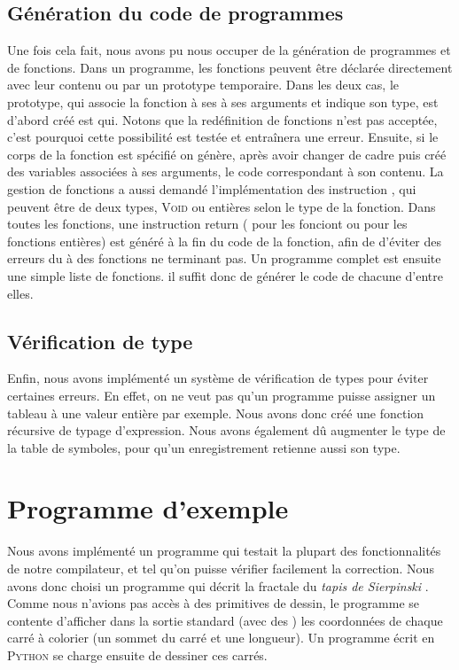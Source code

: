 \documentclass[french]{article}
\begin{document}
  \subsection{Génération du code de programmes}
Une fois cela fait, nous avons pu nous occuper de la génération de programmes et de fonctions. Dans un programme, les fonctions peuvent être déclarée directement avec leur contenu ou par un prototype temporaire. Dans les deux cas, le prototype, qui associe la fonction à ses à ses arguments et indique son type, est d'abord créé est qui. Notons que la redéfinition de fonctions n'est pas acceptée, c'est pourquoi cette possibilité est testée et entraînera une erreur. Ensuite, si le corps de la fonction est spécifié on génère, après avoir changer de cadre puis créé des variables associées à ses arguments, le code correspondant à son contenu. La gestion de fonctions a aussi demandé l'implémentation des instruction \return, qui peuvent être de deux types, \textsc{Void} ou entières selon le type de la fonction. Dans toutes les fonctions, une instruction return ( pour les fonciont \void ou  pour les fonctions entières) est généré à la fin du code de la fonction, afin de d'éviter des erreurs du à des fonctions ne terminant pas.
Un programme complet est ensuite une simple liste de fonctions. il suffit donc de générer le code de chacune d'entre elles.
  \subsection{Vérification de type}
  Enfin, nous avons implémenté un système de vérification de types pour éviter certaines erreurs. En effet, on ne veut pas qu'un programme puisse assigner un tableau à une valeur entière par exemple. Nous avons donc créé une fonction récursive de typage d'expression. Nous avons également dû augmenter le type de la table de symboles, pour qu'un enregistrement retienne aussi son type.

  
\section{Programme d'exemple}
Nous avons implémenté un programme qui testait la plupart des fonctionnalités de notre compilateur, et tel qu'on puisse vérifier facilement la correction. Nous avons donc choisi un programme qui décrit la fractale du \textit{tapis de Sierpinski} . Comme nous n'avions pas accès à des primitives de dessin, le programme se contente d'afficher dans la sortie standard (avec des \iprint) les coordonnées de chaque carré à colorier (un sommet du carré et une longueur). Un programme écrit en \textsc{Python} se charge ensuite de dessiner ces carrés.
\end{document}
